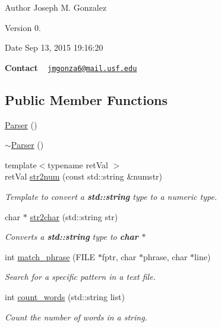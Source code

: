 \begin{DoxyAuthor}{Author}
Joseph M. Gonzalez
\end{DoxyAuthor}
\begin{DoxyVersion}{Version}
0.
\end{DoxyVersion}
\begin{DoxyDate}{Date}
Sep 13, 2015 19\+:16\+:20
\end{DoxyDate}
{\bfseries Contact} ~\newline
 \href{mailto:jmgonza6@mail.usf.edu}{\tt jmgonza6@mail.\+usf.\+edu} \subsection*{Public Member Functions}
\begin{DoxyCompactItemize}
\item 
\hyperlink{class_parser_a12234f6cd36b61af4b50c94a179422c1}{Parser} ()
\item 
\hyperlink{class_parser_a3e658b5917a93a3ef648050d060e3a93}{$\sim$\+Parser} ()
\item 
{\footnotesize template$<$typename ret\+Val $>$ }\\ret\+Val \hyperlink{class_parser_a7fd979d81465947482756e449939cc86}{str2num} (const std\+::string \&numstr)
\begin{DoxyCompactList}\small\item\em Template to convert a {\bfseries {\ttfamily std\+::string}} type to a numeric type. \end{DoxyCompactList}\item 
char $\ast$ \hyperlink{class_parser_ac9491abb25649667d76cce465f5e83e3}{str2char} (std\+::string str)
\begin{DoxyCompactList}\small\item\em Converts a {\bfseries {\ttfamily std\+::string}} type to {\bfseries {\ttfamily char} $\ast$} \end{DoxyCompactList}\item 
int \hyperlink{class_parser_af09b8e0fbda4e0c5a4d54aa8bebb0af4}{match\+\_\+phrase} (F\+I\+L\+E $\ast$fptr, char $\ast$phrase, char $\ast$line)
\begin{DoxyCompactList}\small\item\em Search for a specific pattern in a text file. \end{DoxyCompactList}\item 
int \hyperlink{class_parser_a70a6ed79f6a59e99d232c62002b0f1d0}{count\+\_\+words} (std\+::string list)
\begin{DoxyCompactList}\small\item\em Count the number of words in a string. \end{DoxyCompactList}\item 

\end{DoxyCompactItemize}
